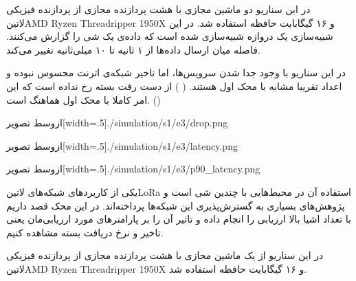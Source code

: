در این سناریو دو ماشین مجازی با هشت پردازنده مجازی از پردازنده فیزیکی
‌لاتین{AMD Ryzen Threadripper 1950X}
و ۱۶ گیگابایت حافظه استفاده شد.
در این شبیه‌سازی یک دروازه شبیه‌سازی شده است که داده‌ی یک شی را گزارش می‌کنند. فاصله میان ارسال داده‌ها از ۱ ثانیه تا ۱۰ میلی‌ثانیه تغییر می‌کند.

در این سناریو با وجود جدا شدن سرویس‌ها، اما تاخیر شبکه‌ی اترنت محسوس نبوده و اعداد تقریبا مشابه با محک اول هستند.
( )
از دست رفت بسته رخ نداده است که این امر کاملا با محک اول هماهنگ است. ()

‌ازوسط
‌تصویر[width=.5\textwidth]{./simulation/s1/e3/drop.png}

‌ازوسط
‌تصویر[width=.5\textwidth]{./simulation/s1/e3/latency.png}

‌ازوسط
‌تصویر[width=.5\textwidth]{./simulation/s1/e3/p90_latency.png}



یکی از کاربردهای شبکه‌های ‌لاتین{LoRa} استفاده آن در محیط‌هایی با چندین شی است و پژوهش‌های بسیاری به گسترش‌پذیری این شبکه‌ها پرداخته‌اند.
در این محک قصد داریم با تعداد اشیا بالا ارزیابی را انجام داده و تاثیر آن را بر پارامترهای مورد ارزیابی‌مان یعنی تاخیر و نرخ دریافت بسته مشاهده کنیم.

در این سناریو از یک ماشین محازی با هشت پردازنده مجازی از پردازنده فیزیکی
‌لاتین{AMD Ryzen Threadripper 1950X}
و ۱۶ گیگابایت حافظه استفاده شد.


